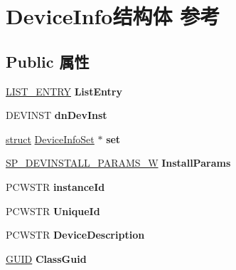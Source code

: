 \hypertarget{struct_device_info}{}\section{Device\+Info结构体 参考}
\label{struct_device_info}
\subsection*{Public 属性}
\begin{DoxyCompactItemize}
\item 
\mbox{\label{struct_device_info_ac86b660d9b60384c8d087885ca1d7b1e}} 
\hyperlink{struct___l_i_s_t___e_n_t_r_y}{L\+I\+S\+T\+\_\+\+E\+N\+T\+RY} {\bfseries List\+Entry}
\item 
\mbox{\label{struct_device_info_a86746280174a843aa6e04e00304e7340}} 
D\+E\+V\+I\+N\+ST {\bfseries dn\+Dev\+Inst}
\item 
\mbox{\label{struct_device_info_af084dde554aacd575836c4d036b009ff}} 
\hyperlink{interfacestruct}{struct} \hyperlink{struct_device_info_set}{Device\+Info\+Set} $\ast$ {\bfseries set}
\item 
\mbox{\label{struct_device_info_ac3bfa0138fd9859f950401c9db6a825b}} 
\hyperlink{struct___s_p___d_e_v_i_n_s_t_a_l_l___p_a_r_a_m_s___w}{S\+P\+\_\+\+D\+E\+V\+I\+N\+S\+T\+A\+L\+L\+\_\+\+P\+A\+R\+A\+M\+S\+\_\+W} {\bfseries Install\+Params}
\item 
\mbox{\label{struct_device_info_a6ec05daab8e6f91c9185e8cc8c1e5c22}} 
P\+C\+W\+S\+TR {\bfseries instance\+Id}
\item 
\mbox{\label{struct_device_info_aa2707246a6903d6d78595227c61d5143}} 
P\+C\+W\+S\+TR {\bfseries Unique\+Id}
\item 
\mbox{\label{struct_device_info_a08af53062102a83045077a8e123c3be0}} 
P\+C\+W\+S\+TR {\bfseries Device\+Description}
\item 
\mbox{\label{struct_device_info_afcf4054c7dd8f1cd4af9d461a8c813f9}} 
\hyperlink{interface_g_u_i_d}{G\+U\+ID} {\bfseries Class\+Guid}

\end{DoxyCompactItemize}

